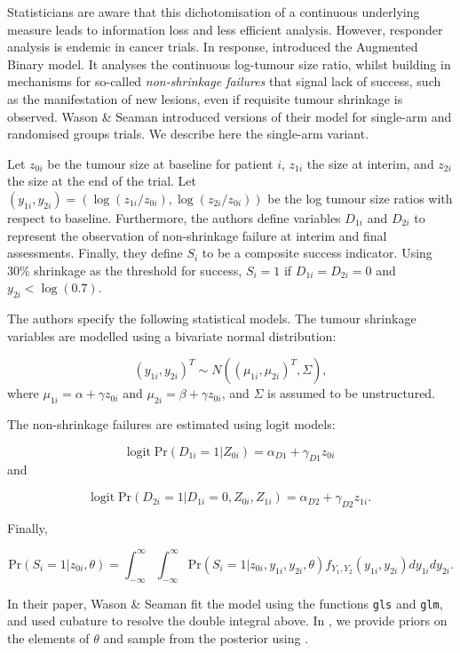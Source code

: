 \documentclass[article]{jss}
\begin{document}
Statisticians are aware that this dichotomisation of a continuous
underlying measure leads to information loss and less efficient
analysis. However, responder analysis is endemic in cancer trials. In
response, \citet{Wason2013} introduced the Augmented Binary model. It
analyses the continuous log-tumour size ratio, whilst building in
mechanisms for so-called \textit{non-shrinkage failures} that signal
lack of success, such as the manifestation of new lesions, even if
requisite tumour shrinkage is observed. Wason \& Seaman introduced
versions of their model for single-arm and randomised groups trials. We
describe here the single-arm variant.

Let \(z_{0i}\) be the tumour size at baseline for patient \(i\),
\(z_{1i}\) the size at interim, and \(z_{2i}\) the size at the end of
the trial. Let
\((y_{1i}, y_{2i}) = (\log{(z_{1i} / z_{0i})}, \log{(z_{2i} / z_{0i})})\)
be the log tumour size ratios with respect to baseline. Furthermore, the
authors define variables \(D_{1i}\) and \(D_{2i}\) to represent the
observation of non-shrinkage failure at interim and final assessments.
Finally, they define \(S_i\) to be a composite success indicator. Using
30\% shrinkage as the threshold for success, \(S_i = 1\) if
\(D_{1i} = D_{2i} = 0\) and \(y_{2i} < \log{(0.7)}\).

The authors specify the following statistical models. The tumour
shrinkage variables are modelled using a bivariate normal distribution:

\[ (y_{1i}, y_{2i})^T \sim N\left( (\mu_{1i}, \mu_{2i})^T, \Sigma\right),\]
where \(\mu_{1i} = \alpha + \gamma z_{0i}\) and
\(\mu_{2i} = \beta + \gamma z_{0i}\), and \(\Sigma\) is assumed to be
unstructured.

The non-shrinkage failures are estimated using logit models:

\[ \text{logit} \; \text{Pr}(D_{1i} = 1 | Z_{0i}) = \alpha_{D1} + \gamma_{D1} z_{0i} \]
and

\[ \text{logit} \; \text{Pr}(D_{2i} = 1 | D_{1i} = 0, Z_{0i}, Z_{1i}) = \alpha_{D2} + \gamma_{D2} z_{1i} .\]

Finally,

\[ \text{Pr}(S_i = 1 | z_{0i}, \theta) = \int_{-\infty}^\infty \int_{-\infty}^\infty \text{Pr}(S_i = 1 | z_{0i}, y_{1i}, y_{2i}, \theta) f_{Y_1, Y_2}(y_{1i}, y_{2i}) dy_{1i} dy_{2i} .\]

In their paper, Wason \& Seaman fit the model using the 
functions \texttt{gls} and \texttt{glm}, and used cubature to resolve
the double integral above. In , we provide priors on the
elements of \(\theta\) and sample from the posterior using
.
\end{document}
